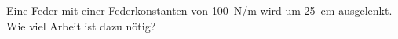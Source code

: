 
\begin{aufgabe}
	Eine Feder mit einer Federkonstanten von \SI{100}{N/m} wird um \SI{25}{cm} ausgelenkt.
	Wie viel Arbeit ist dazu nötig?
\end{aufgabe}
